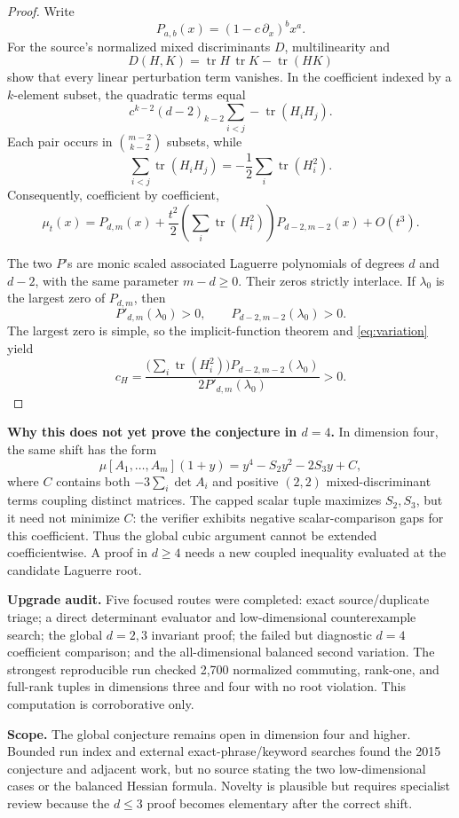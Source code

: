\documentclass[10pt]{article}
\newcommand{\tr}{\operatorname{tr}}
\newcommand{\mcp}{\mu[A_1,\ldots,A_m]}
\begin{document}
\begin{proof}
Write
\[
 P_{a,b}(x)=(1-c\,\partial_x)^b x^a.
\]
For the source's normalized mixed discriminants \(D\), multilinearity and
\[
 D(H,K)=\tr H\,\tr K-\tr(HK)
\]
show that every linear perturbation term vanishes.  In the coefficient indexed
by a \(k\)-element subset, the quadratic terms equal
\[
 c^{k-2}(d-2)_{k-2}\sum_{i<j}-\tr(H_iH_j).
\]
Each pair occurs in \(\binom{m-2}{k-2}\) subsets, while
\[
 \sum_{i<j}\tr(H_iH_j)=-\frac12\sum_i\tr(H_i^2).
\]
Consequently, coefficient by coefficient,
\begin{equation}\label{eq:variation}
 \mu_t(x)=P_{d,m}(x)+\frac{t^2}{2}
 \left(\sum_i\tr(H_i^2)\right)P_{d-2,m-2}(x)+O(t^3).
\end{equation}

The two \(P\)'s are monic scaled associated Laguerre polynomials of degrees
\(d\) and \(d-2\), with the same parameter \(m-d\ge0\).  Their zeros strictly
interlace.  If \(\lambda_0\) is the largest zero of \(P_{d,m}\), then
\[
 P'_{d,m}(\lambda_0)>0,
 \qquad P_{d-2,m-2}(\lambda_0)>0.
\]
The largest zero is simple, so the implicit-function theorem and
\eqref{eq:variation} yield
\[
 c_H=
 \frac{\bigl(\sum_i\tr(H_i^2)\bigr)P_{d-2,m-2}(\lambda_0)}
 {2P'_{d,m}(\lambda_0)}>0.
\]
\end{proof}

\textbf{Why this does not yet prove the conjecture in \(d=4\).}
In dimension four, the same shift has the form
\[
 \mcp(1+y)=y^4-S_2y^2-2S_3y+C,
\]
where \(C\) contains both \(-3\sum_i\det A_i\) and positive \((2,2)\)
mixed-discriminant terms coupling distinct matrices.  The capped scalar tuple
maximizes \(S_2,S_3\), but it need not minimize \(C\): the verifier exhibits
negative scalar-comparison gaps for this coefficient.  Thus the global cubic
argument cannot be extended coefficientwise.  A proof in \(d\ge4\) needs a
new coupled inequality evaluated at the candidate Laguerre root.

\textbf{Upgrade audit.}
Five focused routes were completed: exact source/duplicate triage; a direct
determinant evaluator and low-dimensional counterexample search; the global
\(d=2,3\) invariant proof; the failed but diagnostic \(d=4\) coefficient
comparison; and the all-dimensional balanced second variation.  The strongest
reproducible run checked 2,700 normalized commuting, rank-one, and full-rank
tuples in dimensions three and four with no root violation.  This computation
is corroborative only.

\textbf{Scope.}
The global conjecture remains open in dimension four and higher.  Bounded run
index and external exact-phrase/keyword searches found the 2015 conjecture and
adjacent work, but no source stating the two low-dimensional cases or the
balanced Hessian formula.  Novelty is plausible but requires specialist
review because the \(d\le3\) proof becomes elementary after the correct shift.
\end{document}

